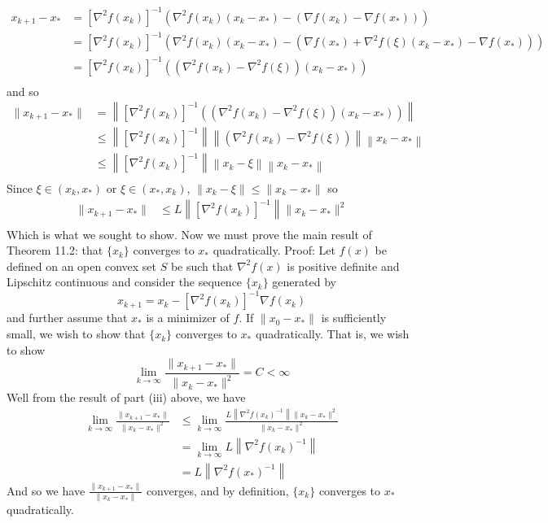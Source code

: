 \documentclass{article}
\begin{document}
\begin{itemize}
    \begin{align*}
        x_{k+1} - x_* &= \left[\nabla^2f(x_k)\right]^{-1}\left(\nabla^2f(x_k)(x_k - x_*) - (\nabla f(x_k) - \nabla f(x_*))\right) \\
        &= \left[\nabla^2f(x_k)\right]^{-1}\left(\nabla^2f(x_k)(x_k - x_*) - (\nabla f(x_*) + \nabla^2f(\xi)(x_k - x_*) - \nabla f(x_*))\right)\\
        &= \left[\nabla^2f(x_k)\right]^{-1}\left((\nabla^2f(x_k) - \nabla^2f(\xi))(x_k - x_*)\right)\\
    \end{align*}
    and so
    \begin{align*}
        \|x_{k+1} - x_*\| &= \left\|\left[\nabla^2f(x_k)\right]^{-1}\left((\nabla^2f(x_k) - \nabla^2f(\xi))(x_k - x_*)\right)\right\|\\
        &\leq \left\|\left[\nabla^2f(x_k)\right]^{-1}\right\|\left\|\left(\nabla^2f(x_k) - \nabla^2f(\xi)\right)\right\|\left\|x_k - x_*\right\|\\
        &\leq \left\|\left[\nabla^2f(x_k)\right]^{-1}\right\|\left\|x_k - \xi\right\|\left\|x_k - x_*\right\|\\
    \end{align*}
    Since $\xi \in (x_k, x_*)$ or $\xi \in (x_*, x_k)$, $\|x_k - \xi\| \leq \|x_k - x_*\|$ so
    \begin{align*}
        \|x_{k+1} - x_*\| &\leq L\left\|\left[\nabla^2f(x_k)\right]^{-1}\right\|\|x_k - x_*\|^2\\
    \end{align*}
    Which is what we sought to show.
    \newline\newline
    Now we must prove the main result of Theorem 11.2: that $\{x_k\}$ converges to $x_*$ quadratically. 
    \newline
    Proof: Let $f(x)$ be defined on an open convex set $S$ be such that $\nabla^2f(x)$ is positive definite and Lipschitz continuous and consider the sequence $\{x_k\}$ generated by
    \[x_{k+1} = x_k - \left[\nabla^2f(x_k)\right]^{-1}\nabla f(x_k)\]
    and further assume that $x_*$ is a minimizer of $f$. If $\|x_0 - x_*\|$ is sufficiently small, we wish to show that $\{x_k\}$ converges to $x_*$ quadratically. That is, we wish to show
    \[\lim_{k \to \infty} \frac{\|x_{k+1} - x_*\|}{\|x_k - x_*\|^2} = C < \infty\]
    Well from the result of part (iii) above, we have
    \begin{align*}
        \lim_{k \to \infty}\frac{\|x_{k+1} - x_*\|}{\|x_k - x_*\|^2} &\leq \lim_{k \to \infty}\frac{L\left\|\nabla^2f(x_k)^{-1}\right\|\|x_k - x_*\|^2}{\|x_k - x_*\|^2}\\
        &= \lim_{k \to \infty} L\left\|\nabla^2f(x_k)^{-1}\right\|\\
        &= L\left\|\nabla^2f(x_*)^{-1}\right\|
    \end{align*}
    And so we have $\frac{\|x_{k+1} - x_*\|}{\|x_k - x_*\|}$ converges, and by definition, $\{x_k\}$ converges to $x_*$ quadratically.
    
\end{itemize}
\end{document}
